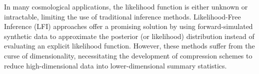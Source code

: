 \documentclass{aa}
\begin{document}
 
  \abstract
   {In many cosmological applications, the likelihood function is either unknown or intractable, limiting the use of traditional inference methods. Likelihood-Free Inference (LFI) approaches offer a promising solution by using forward-simulated synthetic data to approximate the posterior (or likelihood) distribution instead of evaluating an explicit likelihood function. However, these methods suffer from the curse of dimensionality, necessitating the development of compression schemes to reduce high-dimensional data into lower-dimensional summary statistics.


    


    

   }   
\end{document}
